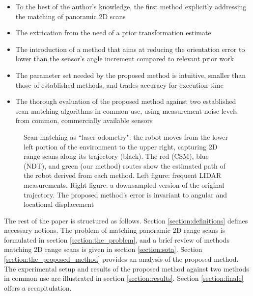 \begin{itemize}
  \item To the best of the author's knowledge, the first method explicitly
        addressing the matching of panoramic 2D scans
  \item The extrication from the need of a prior transformation estimate
  \item The introduction of a method that aims at reducing the orientation
        error to lower than the sensor's angle increment compared to relevant
        prior work
  \item The parameter set needed by the proposed method is intuitive, smaller
        than those of established methods, and trades accuracy for execution
        time
  \item The thorough evaluation of the proposed method against two established
        scan-matching algorithms in common use, using measurement noise levels
        from common, commercially available sensors
\end{itemize}

\begin{figure}[]\centering
  \vspace{-1.7cm}
  
  \vspace{-2.3cm}
  \caption{\small Scan-matching as ``laser odometry": the robot moves from the
           lower left portion of the environment to the upper right, capturing
           2D range scans along its trajectory (black). The red (CSM), blue
           (NDT), and green (our method) routes show the estimated path of the
           robot derived from each method. Left figure: frequent LIDAR
           measurements.  Right figure: a downsampled version of the original
           trajectory. The proposed method's error is invariant to angular and
           locational displacement}
  \label{fig:laser_odometry}
\end{figure}

The rest of the paper is structured as follows. Section
\ref{section:definitions} defines necessary notions.  The problem of matching
panoramic 2D range scans is formulated in section \ref{section:the_problem},
and a brief review of methods matching 2D range scans is given in section
\ref{section:sota}. Section \ref{section:the_proposed_method} provides an
analysis of the proposed method. The experimental setup and results of the
proposed method against two methods in common use are illustrated in section
\ref{section:results}. Section \ref{section:finale} offers a recapitulation.
